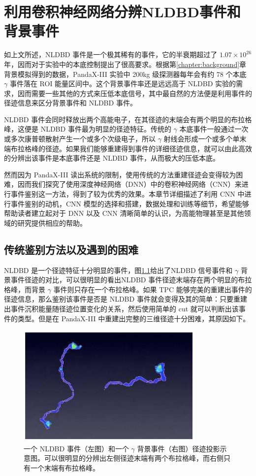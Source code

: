
\chapter{利用卷积神经网络分辨NLDBD事件和背景事件}
\label{chapter:cnn}

如上文所述，NLDBD 事件是一个极其稀有的事件，它的半衰期超过了 $1.07\times10^{26}$ 年，因而对于实验中的本底控制提出了很高要求。根据第\ref{chapter:background}章背景模拟得到的数据，PandaX-III 实验中 200kg 级探测器每年会有约 78 个本底 $\gamma$ 事件落在 ROI 能量区间中。这个背景事件率还是远远高于 NLDBD 实验的需求，因而需要一些其他的方式来压低本底信号，其中最自然的方法便是利用事件的径迹信息来区分背景事件和 NLDBD 事件。

NLDBD 事件会同时释放出两个高能电子，在其径迹的末端会有两个明显的布拉格峰，这便是 NLDBD 事件最为明显的径迹特征。传统的 $\gamma$ 本底事件一般通过一次或多次康普顿散射产生一个或多个次级电子，所以 $\gamma$ 射线会形成一个或多个单末端布拉格峰的径迹。如果我们能够重建得到事件的详细径迹信息，就可以由此高效的分辨出该事件是本底事件还是 NLDBD 事件，从而极大的压低本底。

然而因为 PandaX-III 读出系统的限制，使用传统的方法重建径迹会变得较为困难，因而我们探究了使用深度神经网络（DNN）中的卷积神经网络（CNN）来进行事件鉴别这一方法，得到了较为优秀的效果。本章节详细描述了利用 CNN 中进行事件鉴别的动机，CNN 模型的选择和搭建，数据处理和训练等细节，希望能够帮助读者建立起对于 DNN 以及 CNN 清晰简单的认识，为高能物理甚至是其他领域的研究提供相应的帮助。

\section{传统鉴别方法以及遇到的困难}

NLDBD 是一个径迹特征十分明显的事件，图\ref{fig:samples}给出了NLDBD 信号事件和 $\gamma$ 背景事件径迹的对比，可以很明显的看出NLDBD 事件径迹末端存在两个明显的布拉格峰，而背景 $\gamma$ 事件则只存在一个布拉格峰。如果 TPC 能够完美的重建出事件的径迹信息，那么鉴别该事件是否是 NLDBD 事件就会变得及其的简单：只要重建出事件沉积能量随径迹位置变化的关系，然后使用简单的 cut 就可以判断出该事件的类型。但是在 PandaX-III 中重建出完整的三维径迹十分困难，其原因如下。

\begin{figure}[hbt]
    \centering
    \includegraphics[width=0.5\columnwidth]{pic/fig10.png}
    \caption{一个 NLDBD 事件（左图）和一个 $\gamma$ 背景事件（右图）径迹投影示意图。可以很明显的分辨出左侧径迹末端有两个布拉格峰，而右侧只有一个末端有布拉格峰。}
    \label{fig:samples}
\end{figure}

